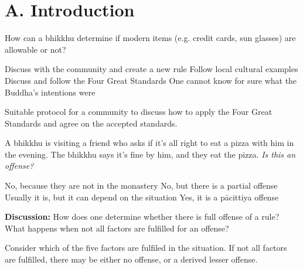 \chapter{A. Introduction}
\renewcommand*{\theChapterTitle}{A. Introduction}

\begin{exam}{\autoExamName}

\begin{problem}

  How can a bhikkhu determine if modern items (e.g. credit cards, sun glasses) are allowable or not?

  \bigskip

  \begin{answers}{1}
    \bChoices
     Discuss with the community and create a new rule\eAns
     Follow local cultural examples\eAns
     Discuss and follow the Four Great Standards\eAns
     One cannot know for sure what the Buddha's intentions were\eAns
    \eChoices
  \end{answers}

  \begin{solution}
    Suitable protocol for a community to discuss how to apply the Four Great
    Standards and agree on the accepted standards.
  \end{solution}

\end{problem}

\problemDivide

\begin{problem}

  A bhikkhu is visiting a friend who asks if it's all right to eat a pizza with
  him in the evening. The bhikkhu says it's fine by him, and they eat the pizza.
  \emph{Is this an offense?}

  \bigskip

  \begin{answers}{1}
    \bChoices
     No, because they are not in the monastery\eAns
     No, but there is a partial offense\eAns
     Usually it is, but it can depend on the situation\eAns
     Yes, it is a pācittiya offense\eAns
    \eChoices
  \end{answers}

  \bigskip

  \textbf{Discussion:} How does one determine whether there is full offense of a
  rule? What happens when not all factors are fulfilled for an offense?

  \begin{solution}
    Consider which of the five factors are fulfiled in the situation. If not all
    factors are fulfilled, there may be either no offense, or a derived lesser
    offense.
  \end{solution}


\end{problem}
\end{exam}
